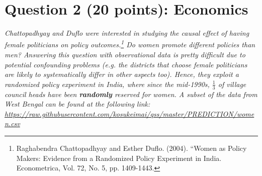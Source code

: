\documentclass[12pt,letterpaper]{article}
\begin{document}
\section*{Question 2 (20 points): Economics}
\textit{Chattopadhyay and Duflo were interested in studying the causal effect of having female politicians on policy outcomes.\footnote{Raghabendra Chattopadhyay and Esther Duflo. (2004). ``Women as Policy Makers: Evidence from a Randomized Policy Experiment in India. Econometrica, Vol. 72, No. 5, pp. 1409-1443.} Do women promote different policies than men? Answering this question with observational data is pretty difficult due to potential confounding problems (e.g. the districts that choose female politicians are likely to systematically differ in other aspects too). Hence, they exploit a randomized policy experiment in India, where since the mid-1990s, $\frac{1}{3}$ of village council heads have been {\bf{randomly}} reserved for women. A subset of the data from West Bengal can be found at the following link: \url{https://raw.githubusercontent.com/kosukeimai/qss/master/PREDICTION/women.csv}}\\
\end{document}
